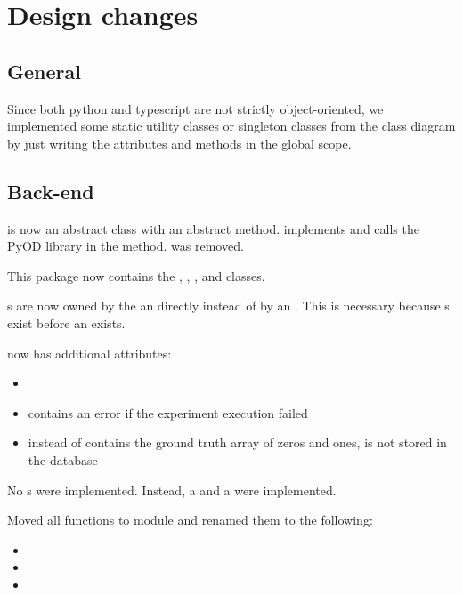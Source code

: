 \section{Design changes}

\subsection{General}
Since both \gls{python} and \gls{typescript} are not strictly object-oriented, we implemented some static utility classes or singleton classes from the class diagram by just writing the attributes and methods in the global scope.

\subsection{Back-end}
 is now an abstract class with an abstract  method.
 implements  and calls the \gls{PyOD} library in the  method.
 was removed.

This package now contains the , , , and  classes.

s are now owned by the an  directly instead of by an . This is necessary because s exist before an  exists.

 now has additional attributes:
\begin{itemize}
    \item {}
    \item {} contains an error if the experiment execution failed
    \item {} instead of  contains the ground truth array of zeros and ones, is not stored in the database
\end{itemize}

No s were implemented. Instead, a  and a  were implemented.

Moved all functions to module  and renamed them to the following:
\begin{itemize}
    \item {}
    \item {}
    \item {}
\end{itemize}

